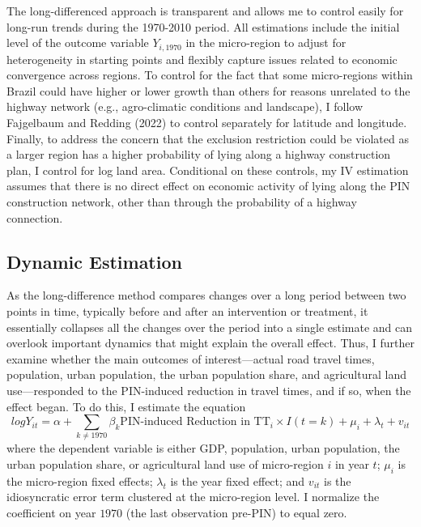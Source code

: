 \documentclass[11pt]{article}
\begin{document}
The long-differenced approach is transparent and allows me to control easily for long-run trends during the 1970-2010 period. All estimations include the initial level of the outcome variable $Y_{i, 1970}$ in the micro-region to adjust for heterogeneity in starting points and flexibly capture issues related to economic convergence across regions. To control for the fact that some micro-regions within Brazil could have higher or lower growth than others for reasons unrelated to the highway network (e.g., agro-climatic conditions and landscape), I follow Fajgelbaum and Redding (2022) to control separately for latitude and longitude. Finally, to address the concern that the exclusion restriction could be violated as a larger region has a higher probability of lying along a highway construction plan, I control for log land area. Conditional on these controls, my IV estimation assumes that there is no direct effect on economic activity of lying along the PIN construction network, other than through the probability of a highway connection. 

\subsection{Dynamic Estimation}

As the long-difference method compares changes over a long period between two points in time, typically before and after an intervention or treatment, it essentially collapses all the changes over the period into a single estimate and can overlook important dynamics that might explain the overall effect. Thus, I further examine whether the main outcomes of interest—actual road travel times, population, urban population, the urban population share, and agricultural land use—responded to the PIN-induced reduction in travel times, and if so, when the effect began. To do this, I estimate the equation
\begin{equation}
logY_{it} = \alpha + \sum_{k \neq \text{1970}} \beta_{k}\text{PIN-induced Reduction in TT}_{i} \times I(t=k) + \mu_{i} + \lambda_{t} + v_{it}
\label{eq:dynamic}
\end{equation}
where the dependent variable is either GDP, population, urban population, the urban population share, or agricultural land use of micro-region $i$ in year $t$; $\mu_i$ is the micro-region fixed effects; $\lambda_t$ is the year fixed effect; and $v_{it}$ is the idiosyncratic error term clustered at the micro-region level. I normalize the coefficient on year $1970$ (the last observation pre-PIN) to equal zero. 
\end{document}
